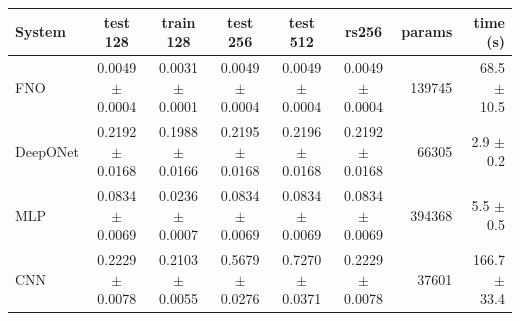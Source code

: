 \begin{tabular}{lcccccrr}
\toprule
System & test 128 & train 128 & test 256 & test 512 & rs256 & params & time (s) \\
\midrule
FNO & 0.0049 $\pm$ 0.0004 & 0.0031 $\pm$ 0.0001 & 0.0049 $\pm$ 0.0004 & 0.0049 $\pm$ 0.0004 & 0.0049 $\pm$ 0.0004 & 139745 & 68.5 $\pm$ 10.5 \\
DeepONet & 0.2192 $\pm$ 0.0168 & 0.1988 $\pm$ 0.0166 & 0.2195 $\pm$ 0.0168 & 0.2196 $\pm$ 0.0168 & 0.2192 $\pm$ 0.0168 & 66305 & 2.9 $\pm$ 0.2 \\
MLP & 0.0834 $\pm$ 0.0069 & 0.0236 $\pm$ 0.0007 & 0.0834 $\pm$ 0.0069 & 0.0834 $\pm$ 0.0069 & 0.0834 $\pm$ 0.0069 & 394368 & 5.5 $\pm$ 0.5 \\
CNN & 0.2229 $\pm$ 0.0078 & 0.2103 $\pm$ 0.0055 & 0.5679 $\pm$ 0.0276 & 0.7270 $\pm$ 0.0371 & 0.2229 $\pm$ 0.0078 & 37601 & 166.7 $\pm$ 33.4 \\
\bottomrule
\end{tabular}
